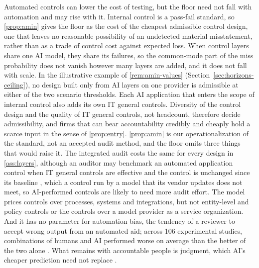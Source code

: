 Automated controls can lower the cost of testing, but the floor need not fall with automation and may rise with it. Internal control is a pass-fail standard, so \autoref{prop:amin} gives the floor as the cost of the cheapest admissible control design, one that leaves no reasonable possibility of an undetected material misstatement, rather than as a trade of control cost against expected loss. When control layers share one AI model, they share its failures, so the common-mode part of the miss probability does not vanish however many layers are added, and it does not fall with scale. In the illustrative example of \autoref{rem:amin-values} (Section~\ref{sec:horizons-ceiling}), no design built only from AI layers on one provider is admissible at either of the two scenario thresholds. Each AI application that enters the scope of internal control also adds its own IT general controls. Diversity of the control design and the quality of IT general controls, not headcount, therefore decide admissibility, and firms that can bear accountability credibly and cheaply hold a scarce input in the sense of \autoref{prop:entry}. \autoref{prop:amin} is our operationalization of the standard, not an accepted audit method, and the floor omits three things that would raise it. The integrated audit costs the same for every design in \autoref{ass:layers}, although an auditor may benchmark an automated application control when IT general controls are effective and the control is unchanged since its baseline \citep[paragraphs B28 to B31]{pcaob2026as2201}, which a control run by a model that its vendor updates does not meet, so AI-performed controls are likely to need more audit effort. The model prices controls over processes, systems and integrations, but not entity-level and policy controls or the controls over a model provider as a service organization. And it has no parameter for automation bias, the tendency of a reviewer to accept wrong output from an automated aid; across 106 experimental studies, combinations of humans and AI performed worse on average than the better of the two alone \citep{vaccaro2024when}. What remains with accountable people is judgment, which AI's cheaper prediction need not replace \citep{agrawal2019exploring}.

